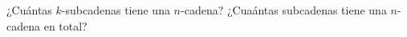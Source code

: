 \begin{statement}{6}
  ¿Cu\'antas $k$-subcadenas tiene una $n$-cadena?
  ¿Cua\'antas subcadenas tiene una $n$-cadena en total?
\end{statement}